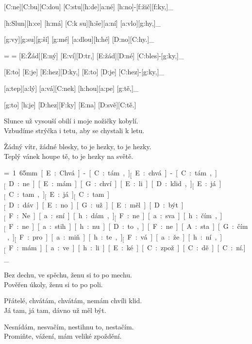 [C:ne][C:bu][C:dou] [C:stu][h:de][a:né] [h:no]-[f:žič][f:ky,]_

[h:Slun][h:ce] [h:má] [C:k su][h:še][a:ní] [a:vlo][g:hy,]_

[g:vy][g:su][g:ší] [g:mé] [a:dlou][h:hé] [D:no][C:hy.]_

\break
\min=
\max=
[E:Žád][E:ný] [E:ví][D:tr,] [E:žád][D:né] [C:bles]-[g:ky,]_

[E:to] [E:je] [E:hez][D:ky,] [E:to] [D:je] [C:hez]-[g:ky,]_

[a:tep][a:lý] [a:vá][C:nek] [h:hou][a:pe] [g:tě,]_

[g:to] [h:je] [D:hez][F:ky] [E:na] [D:svě][C:tě.] %

Slunce už vysouší obilí i moje nožičky kobylí.\\
Vzbudíme strýčka i tetu, aby se chystali k letu.

Žádný vítr, žádné blesky, to je hezky, to je hezky.\\
Teplý vánek houpe tě, to je hezky na světě.



{\unit=1.65mm
[E:Chvá]-[C:tám,]_ [E:chvá]-[C:tám,]_
[D:ne][E:mám] [G:chví][E:li] [D:klid,]_

[E:já]_ [C:tam,]_ [E:já]_ [C:tam]_
[D:dáv][E:no] [G:už] [E:měl] [D:být.]_

[F:Ne][a:sní][h:dám,]_
[F:ne][a:sva][h:čím,]_
[F:ne][a:stih][h:nu] [D:to,] [F:ne][A:sta][G:čím,]_

[F:pro][a:miň][h:te,]_
[F:vá][a:že][h:ní,]_
[F:mám] [a:ve][h:li][E:ké] [C:zpož][C:dě][C:ní.]_
}

Bez dechu, ve spěchu, ženu si to po mechu.\\
Pověřen úkoly, ženu si to po poli.

Přátelé, chvátám, chvátám, nemám chvíli klid.\\
Já tam, já tam, dávno už měl být.

Nesnídám, nesvačím, nestihnu to, nestačím.\\
Promiňte, vážení, mám veliké zpoždění.



